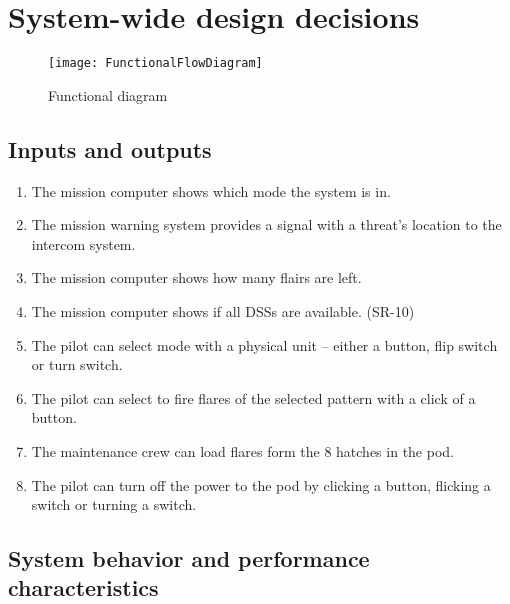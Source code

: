 \documentclass[Main]{subfiles}
\begin{document}
\setcounter{chapter}{2}
\chapter{System-wide design decisions}

\begin{figure}[H]
\centering
\texttt{[image: FunctionalFlowDiagram]}
\caption{Functional diagram}
\end{figure}


\section{Inputs and outputs}

\begin{enumerate}[label=\bfseries DDD-\arabic*:]

\item The mission computer shows which mode the system is in.

\item The mission warning system provides a signal with a threat's location to the intercom system.

\item The mission computer shows how many flairs are left.

\item The mission computer shows if all DSSs are available. (SR-10)

\item The pilot can select mode with a physical unit -- either a button, flip switch or turn switch.

\item The pilot can select to fire flares of the selected pattern with a click of a button.

\item The maintenance crew can load flares form the 8 hatches in the pod.

\item The pilot can turn off the power to the pod by clicking a button, flicking a switch or turning a switch.

\end{enumerate}

\section{System behavior and performance characteristics}
\end{document}
